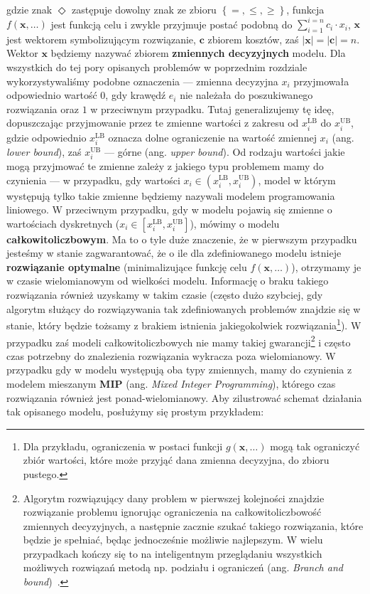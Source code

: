 gdzie znak $\Diamond$ zastępuje dowolny znak ze zbioru $\left\{ =, \leqslant, \geqslant \right\}$, funkcja $f \left( \textbf{x}, \dots \right)$ jest funkcją celu i zwykle przyjmuje postać podobną do $\sum_{i=1}^{i=n} c_{i} \cdot x_{i}$, $\textbf{x}$ jest wektorem symbolizującym rozwiązanie, $\textbf{c}$ zbiorem kosztów, zaś $\left| \textbf{x} \right| = \left| \textbf{c} \right| = n$. Wektor $\textbf{x}$ będziemy nazywać zbiorem \textbf{zmiennych decyzyjnych} modelu. Dla wszystkich do tej pory opisanych problemów w poprzednim rozdziale wykorzystywaliśmy podobne oznaczenia --- zmienna decyzyjna $x_{i}$ przyjmowała odpowiednio wartość $0$, gdy krawędź $e_{i}$ nie należała do poszukiwanego rozwiązania oraz $1$ w przeciwnym przypadku. Tutaj generalizujemy tę ideę, dopuszczając przyjmowanie przez te zmienne wartości z zakresu od $x_{i}^{\textrm{LB}}$ do $x_{i}^{\textrm{UB}}$, gdzie odpowiednio $x_{i}^{\textrm{LB}}$ oznacza dolne ograniczenie na wartość zmiennej $x_{i}$ (ang. \textit{lower bound}), zaś $x_{i}^{\textrm{UB}}$ --- górne (ang. \textit{upper bound}). Od rodzaju wartości jakie mogą przyjmować te zmienne zależy z jakiego typu problemem mamy do czynienia --- w przypadku, gdy wartości $x_{i} \in \left( x_{i}^{\textrm{LB}}, x_{i}^{\textrm{UB}} \right)$, model w którym występują tylko takie zmienne będziemy nazywali modelem programowania liniowego. W przeciwnym przypadku, gdy w modelu pojawią się zmienne o wartościach dyskretnych ($x_{i} \in \left[ x_{i}^{\textrm{LB}}, x_{i}^{\textrm{UB}} \right]$), mówimy o modelu \textbf{całkowitoliczbowym}. Ma to o tyle duże znaczenie, że w pierwszym przypadku jesteśmy w stanie zagwarantować, że o ile dla zdefiniowanego modelu istnieje \textbf{rozwiązanie optymalne} (minimalizujące funkcję celu $f \left( \textbf{x}, \dots \right)$), otrzymamy je w czasie wielomianowym od wielkości modelu. Informację o braku takiego rozwiązania również uzyskamy w takim czasie (często dużo szybciej, gdy algorytm służący do rozwiązywania tak zdefiniowanych problemów znajdzie się w stanie, który będzie tożsamy z brakiem istnienia jakiegokolwiek rozwiązania\footnote{Dla przykładu, ograniczenia w postaci funkcji $g \left( \textbf{x}, \dots \right)$ mogą tak ograniczyć zbiór wartości, które może przyjąć dana zmienna decyzyjna, do zbioru pustego.}). W przypadku zaś modeli całkowitoliczbowych nie mamy takiej gwarancji\footnote{Algorytm rozwiązujący dany problem w pierwszej kolejności znajdzie rozwiązanie problemu ignorując ograniczenia na całkowitoliczbowość zmiennych decyzyjnych, a następnie zacznie szukać takiego rozwiązania, które będzie je spełniać, będąc jednocześnie możliwie najlepszym. W wielu przypadkach kończy się to na inteligentnym przeglądaniu wszystkich możliwych rozwiązań metodą np. podziału i ograniczeń (ang. \textit{Branch and bound})~\cite[$433$--$448$]{Papadimitriou:1982:COA:31027}.} i często czas potrzebny do znalezienia rozwiązania wykracza poza wielomianowy. W przypadku gdy w modelu występują oba typy zmiennych, mamy do czynienia z modelem mieszanym \textbf{MIP} (ang. \textit{Mixed Integer Programming}), którego czas rozwiązania również jest ponad-wielomianowy. Aby zilustrować schemat działania tak opisanego modelu, posłużymy się prostym przykładem:

